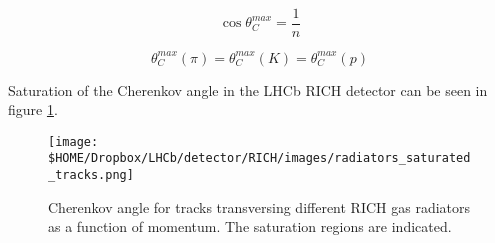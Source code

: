 \begin{equation}
	\cos{\theta_C^{max}} = \frac{1}{n}
	\label{equation: saturated Cherenkov radiation}
\end{equation}

\begin{equation}
	\theta_C^{max}(\pi) = \theta_C^{max}(K) = \theta_C^{max}(p)
\end{equation}

Saturation of the Cherenkov angle in the LHCb RICH detector can be seen in figure \ref{fig: RICH radiator}.

\begin{figure}[h]
	\begin{center}
		\texttt{[image: \$HOME/Dropbox/LHCb/detector/RICH/images/radiators\_saturated\_tracks.png]}
		\caption{Cherenkov angle for tracks transversing different RICH gas radiators as a function of momentum. The saturation regions are indicated.}
		\label{fig: RICH radiator}
	\end{center}
\end{figure}

